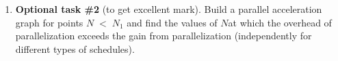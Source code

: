 {\begin{enumerate}
		\item\textbf{Optional task \#2} (to get excellent mark). Build a parallel acceleration graph for points $N\;<\;N_1$ and find the values of $N$at which the overhead of parallelization exceeds the gain from parallelization (independently for different types of schedules).
	\end{enumerate}
}